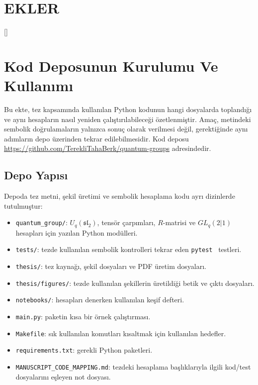 \documentclass[12pt,a4paper,fleqn]{report}
\numberwithin{equation}{chapter}
\newcommand{\headingrule}{\vspace{0.1cm}\titlerule[0.4pt]}
\renewcommand{\thechapter}{\arabic{chapter}}
\renewcommand{\thesection}{\thechapter.\arabic{section}}
\renewcommand{\thefigure}{\thechapter.\arabic{figure}}
\renewcommand{\thetable}{\thechapter.\arabic{table}}
\theoremstyle{plain}
\theoremstyle{definition}
\renewcommand{\sl}{\mathfrak{sl}}
\begin{document}
\clearpage
{}
\chapter*{EKLER}
\appendix
\renewcommand{\thechapter}{\Alph{chapter}}
\renewcommand{\thesection}{\thechapter.\arabic{section}}
\renewcommand{\thefigure}{\thechapter.\arabic{figure}}
\renewcommand{\thetable}{\thechapter.\arabic{table}}
\titleformat{\chapter}[hang]
  {\normalfont\Large\bfseries\raggedleft}{EK~\thechapter}{1em}{}[\headingrule]

\chapter{Kod Deposunun Kurulumu Ve Kullanımı}

Bu ekte, tez kapsamında kullanılan Python kodunun hangi dosyalarda toplandığı
ve aynı hesapların nasıl yeniden çalıştırılabileceği özetlenmiştir. Amaç,
metindeki sembolik doğrulamaların yalnızca sonuç olarak verilmesi değil,
gerektiğinde aynı adımların depo üzerinden tekrar edilebilmesidir. Kod deposu
\url{https://github.com/TerekliTahaBerk/quantum-groups} adresindedir.

\section{Depo Yapısı}

Depoda tez metni, şekil üretimi ve sembolik hesaplama kodu ayrı dizinlerde
tutulmuştur:
\begin{itemize}[leftmargin=*]
  \item \texttt{quantum\_group/}: $U_q(\sl_2)$, tensör çarpımları, $R$-matrisi
        ve $GL_q(2|1)$ hesapları için yazılan Python modülleri.
  \item \texttt{tests/}: tezde kullanılan sembolik kontrolleri tekrar eden
        \texttt{pytest}~\cite{pytest} testleri.
  \item \texttt{thesis/}: tez kaynağı, şekil dosyaları ve PDF üretim dosyaları.
  \item \texttt{thesis/figures/}: tezde kullanılan şekillerin üretildiği betik
        ve çıktı dosyaları.
  \item \texttt{notebooks/}: hesapları denerken kullanılan keşif defteri.
  \item \texttt{main.py}: paketin kısa bir örnek çalıştırması.
  \item \texttt{Makefile}: sık kullanılan komutları kısaltmak için kullanılan
        hedefler.
  \item \texttt{requirements.txt}: gerekli Python paketleri.
  \item \texttt{MANUSCRIPT\_CODE\_MAPPING.md}: tezdeki hesaplama başlıklarıyla
        ilgili kod/test dosyalarını eşleyen not dosyası.
\end{itemize}
\end{document}
